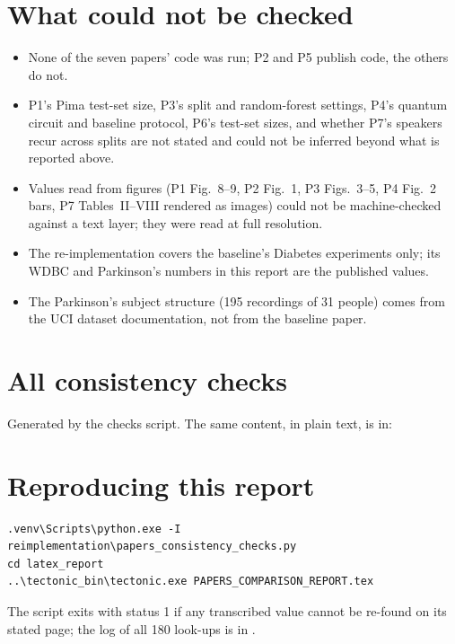 \documentclass[11pt,a4paper]{article}
\newcommand{\tabdir}{../reimplementation/tex/papers/}
\begin{document}
\section{What could not be checked}
\label{sec:limits}
\begin{itemize}
  \item None of the seven papers' code was run; P2 and P5 publish code, the others do not.
  \item P1's Pima test-set size, P3's split and random-forest settings, P4's quantum circuit and baseline protocol, P6's test-set sizes, and whether P7's speakers recur across splits are not stated and could not be inferred beyond what is reported above.
  \item Values read from figures (P1 Fig.~8--9, P2 Fig.~1, P3 Figs.~3--5, P4 Fig.~2 bars, P7 Tables~II--VIII rendered as images) could not be machine-checked against a text layer; they were read at full resolution.
  \item The re-implementation covers the baseline's Diabetes experiments only; its WDBC and Parkinson's numbers in this report are the published values.
  \item The Parkinson's subject structure (195 recordings of 31 people) comes from the UCI dataset documentation, not from the baseline paper.
\end{itemize}

\appendix
\section{All consistency checks}
\label{app:checks}
Generated by the checks script. The same content, in plain text, is in:\\
{\footnotesize\setlength{\tabcolsep}{4pt}

}

\section{Reproducing this report}
\begin{verbatim}
.venv\Scripts\python.exe -I reimplementation\papers_consistency_checks.py
cd latex_report
..\tectonic_bin\tectonic.exe PAPERS_COMPARISON_REPORT.tex
\end{verbatim}
The script exits with status 1 if any transcribed value cannot be re-found on its stated page; the log of all 180 look-ups is in .
\end{document}
